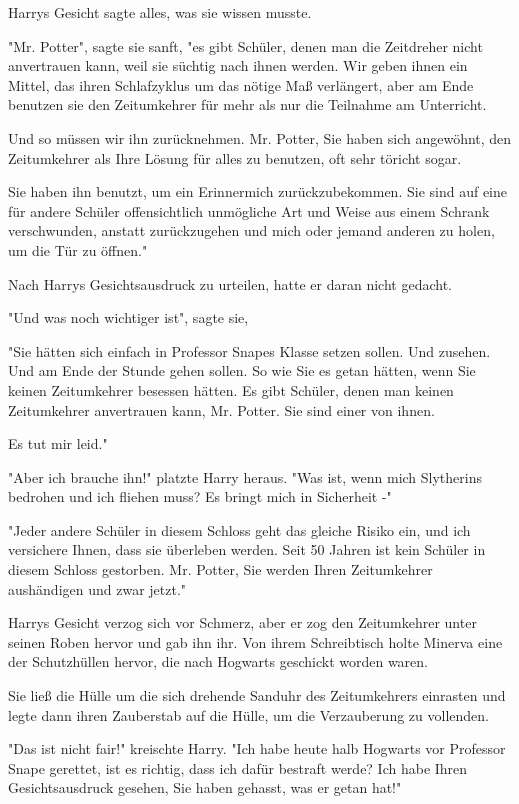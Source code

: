 {Harrys Gesicht sagte alles, was sie wissen musste.

"Mr. Potter", sagte sie sanft, "es gibt Schüler, denen man die Zeitdreher nicht anvertrauen kann, weil sie süchtig nach ihnen werden. Wir geben ihnen ein Mittel, das ihren Schlafzyklus um das nötige Maß verlängert, aber am Ende benutzen sie den Zeitumkehrer für mehr als nur die Teilnahme am Unterricht.

Und so müssen wir ihn zurücknehmen. Mr. Potter, Sie haben sich angewöhnt, den Zeitumkehrer als Ihre Lösung für alles zu benutzen, oft sehr töricht sogar.

Sie haben ihn benutzt, um ein Erinnermich zurückzubekommen. Sie sind auf eine für andere Schüler offensichtlich unmögliche Art und Weise aus einem Schrank verschwunden, anstatt zurückzugehen und mich oder jemand anderen zu holen, um die Tür zu öffnen."

Nach Harrys Gesichtsausdruck zu urteilen, hatte er daran nicht gedacht.

"Und was noch wichtiger ist", sagte sie,

"Sie hätten sich einfach in Professor Snapes Klasse setzen sollen. Und zusehen. Und am Ende der Stunde gehen sollen. So wie Sie es getan hätten, wenn Sie keinen Zeitumkehrer besessen hätten. Es gibt Schüler, denen man keinen Zeitumkehrer anvertrauen kann, Mr. Potter. Sie sind einer von ihnen.

Es tut mir leid."

"Aber ich brauche ihn!" platzte Harry heraus. "Was ist, wenn mich Slytherins bedrohen und ich fliehen muss? Es bringt mich in Sicherheit -"

"Jeder andere Schüler in diesem Schloss geht das gleiche Risiko ein, und ich versichere Ihnen, dass sie überleben werden. Seit 50 Jahren ist kein Schüler in diesem Schloss gestorben. Mr. Potter, Sie werden Ihren Zeitumkehrer aushändigen und zwar jetzt."

Harrys Gesicht verzog sich vor Schmerz, aber er zog den Zeitumkehrer unter seinen Roben hervor und gab ihn ihr. Von ihrem Schreibtisch holte Minerva eine der Schutzhüllen hervor, die nach Hogwarts geschickt worden waren.

Sie ließ die Hülle um die sich drehende Sanduhr des Zeitumkehrers einrasten und legte dann ihren Zauberstab auf die Hülle, um die Verzauberung zu vollenden.

"Das ist nicht fair!" kreischte Harry. "Ich habe heute halb Hogwarts vor Professor Snape gerettet, ist es richtig, dass ich dafür bestraft werde? Ich habe Ihren Gesichtsausdruck gesehen, Sie haben gehasst, was er getan hat!"

}
